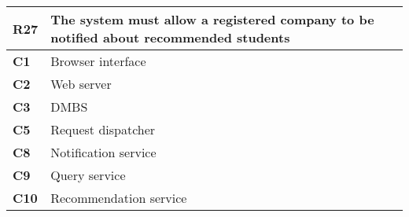 \begin{table}[H]
    \centering
    \begin{tabular}{|l|m{10cm}|}
        \hline \textbf{R27} & The system must allow a registered company to be notified about recommended students \\
        \hline \textbf{C1} & Browser interface \\
        \hline \textbf{C2} & Web server \\
        \hline \textbf{C3} & DMBS \\
        \hline \textbf{C5} & Request dispatcher \\
        \hline \textbf{C8} & Notification service \\
        \hline \textbf{C9} & Query service \\
        \hline \textbf{C10} & Recommendation service \\
        \hline
    \end{tabular}
\end{table}


